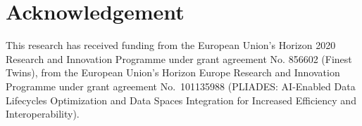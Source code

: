 \documentclass[conference]{IEEEtran}
\begin{document}
\section*{Acknowledgement}
This research has received funding from the European Union’s Horizon 2020 Research and Innovation Programme under grant agreement No. 856602 (Finest Twins), from the European Union's Horizon Europe Research and Innovation Programme under grant agreement No.~101135988 (PLIADES: AI-Enabled Data Lifecycles Optimization and Data Spaces Integration for Increased Efficiency and Interoperability).



\end{document}

